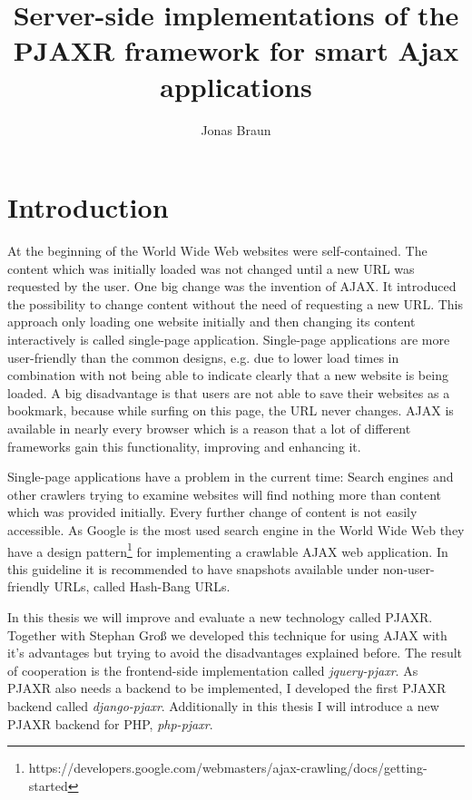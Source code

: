 \documentclass[f,bachelor,binding,twoside,palatino]{WeSTthesis}
\author{Jonas Braun}
\title{Server-side implementations of the PJAXR framework for smart Ajax applications}
\def \ajax {AJAX}
\def \pjaxr {PJAXR}
\def \jqueryPjaxr {jquery-pjaxr}
\def \djangoPjaxr {django-pjaxr}
\def \phpPjaxr {php-pjaxr}
\def \singlePageApplication {single-page application}
\def \SinglePageApplication {Single-page application}
\begin{document}

\maketitle
{}

\tableofcontents

\varclearpage



\newcommand\todo[1]{\textcolor{red}{#1}}

\section{Introduction}
At the beginning of the World Wide Web websites were self-contained. The content which was initially loaded was not changed until a new URL was requested by the user.
One big change was the invention of \ajax{}. It introduced the possibility to change content without the need of requesting a new URL.
This approach only loading one website initially and then changing its content interactively is called \singlePageApplication{}.
\SinglePageApplication{}s are more user-friendly than the common designs, e.g. due to lower load times in combination with not being able to indicate clearly that a new website is being loaded.
A big disadvantage is that users are not able to save their websites as a bookmark, because while surfing on this page, the URL never changes.
\ajax{} is available in nearly every browser which is a reason that a lot of different frameworks gain this functionality, improving and enhancing it.

\SinglePageApplication{}s have a problem in the current time: Search engines and other crawlers trying to examine websites will find nothing more than content which was provided initially. Every further change of content is not easily accessible.
As Google is the most used search engine in the World Wide Web they have a design pattern\footnote{https://developers.google.com/webmasters/ajax-crawling/docs/getting-started} for implementing a crawlable \ajax{} web application. 
In this guideline it is recommended to have snapshots available under non-user-friendly URLs, called Hash-Bang URLs.

In this thesis we will improve and evaluate a new technology called \pjaxr{}. 
Together with Stephan Gro{\ss} we developed this technique for using \ajax{} with it's advantages but trying to avoid the disadvantages explained before.
The result of cooperation is the frontend-side implementation called \emph{\jqueryPjaxr{}}.
As \pjaxr{} also needs a backend to be implemented, I developed the first \pjaxr{} backend called \emph{\djangoPjaxr{}}.
Additionally in this thesis I will introduce a new \pjaxr{} backend for PHP, \emph{\phpPjaxr{}}.
\end{document}
